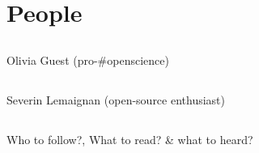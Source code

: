 \section{People}



\subsection{}
{

\begin{frame}{Olivia Guest (pro-\#openscience)}
    \begin{figure}
	
   \end{figure}
	
\end{frame}
}




\subsection{}
{


\begin{frame}{Severin Lemaignan (open-source enthusiast) } 
    \begin{figure}
	
   \end{figure}
	
\end{frame}
}






\subsection{}
{

\begin{frame}{Who to follow?, What to read? \& what to heard? } 
    \begin{figure}
	
   \end{figure}
	
\end{frame}
}


